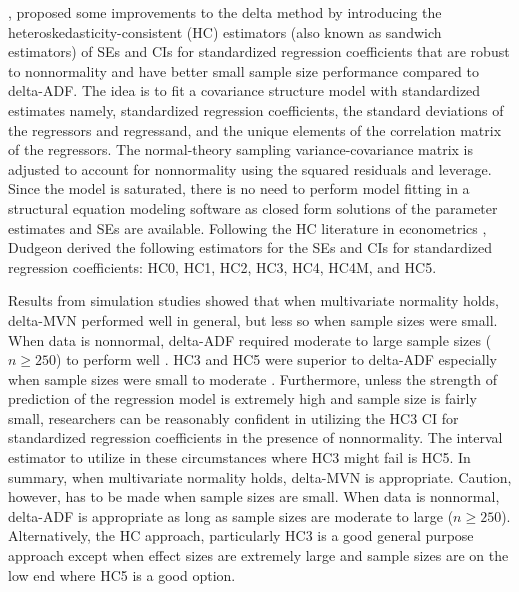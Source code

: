 \documentclass[man]{apa7}\usepackage[]{graphicx}\usepackage[]{xcolor}
\begin{document}
\Textcite{Lib-Regression-Standardized-Coefficients-HC-Dudgeon-2017},
proposed some improvements to the delta method
by introducing the heteroskedasticity-consistent (HC) estimators
(also known as sandwich estimators)
of SEs and CIs for standardized regression coefficients
that are robust to nonnormality and have better small sample size performance
compared to delta-ADF.
The idea is to fit a covariance structure model
with standardized estimates
namely,
standardized regression coefficients,
the standard deviations of the regressors and regressand,
and the unique elements of the correlation matrix of the regressors.
The normal-theory sampling variance-covariance matrix
is adjusted to account for nonnormality
using the squared residuals and leverage.
Since the model is saturated,
there is no need to perform model fitting
in a structural equation modeling software
as closed form solutions of the parameter estimates and SEs are available.
Following the HC literature in econometrics
\parencite[e.g.,][]{Lib-Regression-Heteroskedasticity-Consistent-Standard-Errors-White-1980,
Lib-Regression-Heteroskedasticity-Consistent-Standard-Errors-Cribari-Neto-2007},
Dudgeon
derived the following estimators
for the SEs and CIs for standardized regression coefficients:
HC0, HC1, HC2, HC3, HC4, HC4M, and HC5.

Results from simulation studies
\parencite{Lib-Regression-Standardized-Coefficients-Delta-Yuan-2011,
Lib-Regression-Standardized-Coefficients-Delta-Jones-2013a}
showed that when multivariate normality holds,
delta-MVN performed well in general,
but less so when sample sizes were small.
When data is nonnormal,
delta-ADF required moderate to large sample sizes ($n \geq 250$)
to perform well
\parencite{Lib-Regression-Standardized-Coefficients-Delta-Jones-2015}.
HC3 and HC5 were superior to delta-ADF
especially when sample sizes were small to moderate
\parencite{Lib-Regression-Standardized-Coefficients-HC-Dudgeon-2017}.
Furthermore,
unless the strength of prediction of the regression model is extremely high
and sample size is fairly small,
researchers can be reasonably confident in utilizing the HC3 CI
for standardized regression coefficients in the presence of nonnormality.
The interval estimator to utilize in these circumstances where HC3
might fail is HC5.
In summary,
when multivariate normality holds,
delta-MVN is appropriate.
Caution, however, has to be made when sample sizes are small.
When data is nonnormal,
delta-ADF is appropriate as long as sample sizes
are moderate to large ($n \geq 250$).
Alternatively,
the HC approach,
particularly HC3 is a good general purpose approach
except when effect sizes are extremely large and sample sizes are on the low end
where HC5 is a good option.
\end{document}
